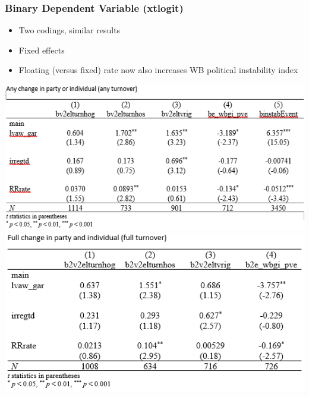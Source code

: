 \documentclass[]{beamer}
\begin{document}
\begin{frame}
\frametitle{Binary Dependent Variable (xtlogit)}
\begin{itemize}
\item Two codings, similar results
\item Fixed effects
\item Floating (versus fixed) rate now also increases WB political instability index
\end{itemize}
\includegraphics{img0010.png}
\includegraphics{img0011.png}
\end{frame}
\end{document}
